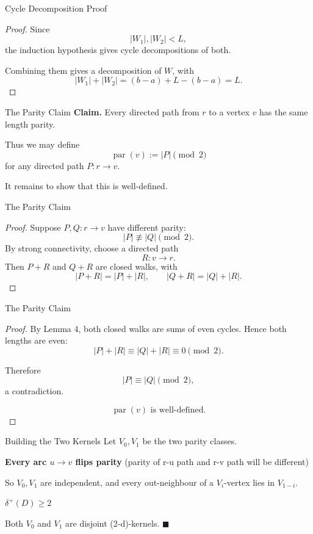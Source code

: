 \documentclass[11pt]{beamer}
\begin{document}
\begin{frame}{Cycle Decomposition Proof}
  \begin{proof}
    Since
    \[
      |W_1|,|W_2|<L,
    \]
    the induction hypothesis gives cycle decompositions of both.

    \medskip
    Combining them gives a decomposition of $W$, with
    \[
      |W_1|+|W_2|
      =(b-a)+L-(b-a)=L.
    \]

    \qedhere
  \end{proof}
\end{frame}

\begin{frame}{The Parity Claim}
  \textbf{Claim.}
  Every directed path from $r$ to a vertex $v$
  has the same length parity.

  \medskip
  Thus we may define
  \[
    \boxed{
      \operatorname{par}(v)
      := |P| \pmod 2
    }
  \]
  for any directed path $P:r\to v$.

  \medskip
  It remains to show that this is well-defined.

\end{frame}

\begin{frame}{The Parity Claim}
  \begin{proof}
    Suppose $P,Q:r\to v$ have different parity:
    \[
      |P|\not\equiv |Q|\pmod 2.
    \]
    By strong connectivity, choose a directed path
    \[
      R:v\to r.
    \]
    Then $P+R$ and $Q+R$ are closed walks, with
    \[
      |P+R|=|P|+|R|,
      \qquad
      |Q+R|=|Q|+|R|.
    \]
  \end{proof}
\end{frame}

\begin{frame}{The Parity Claim}
  \begin{proof}
    By Lemma 4, both closed walks are sums of even cycles.
    Hence both lengths are even:
    \[
      |P|+|R|\equiv |Q|+|R|\equiv0\pmod2.
    \]

    Therefore
    \[
      |P|\equiv|Q|\pmod2,
    \]
    a contradiction.

    \[
      \boxed{\operatorname{par}(v)\text{ is well-defined.}}
    \]
  \end{proof}
\end{frame}

\begin{frame}{Building the Two Kernels}
  Let $V_0, V_1$ be the two parity classes.

  \bigskip
  \textbf{Every arc $u \to v$ flips parity} (parity of r-u path and r-v path will be different)

  \bigskip
  So $V_0, V_1$ are independent, and every
  out-neighbour of a $V_i$-vertex lies in $V_{1-i}$.

  \bigskip
  $\delta^+(D) \ge 2$

  \bigskip
  Both $V_0$ and $V_1$ are disjoint (2-d)-kernels. $\blacksquare$
\end{frame}
\end{document}
